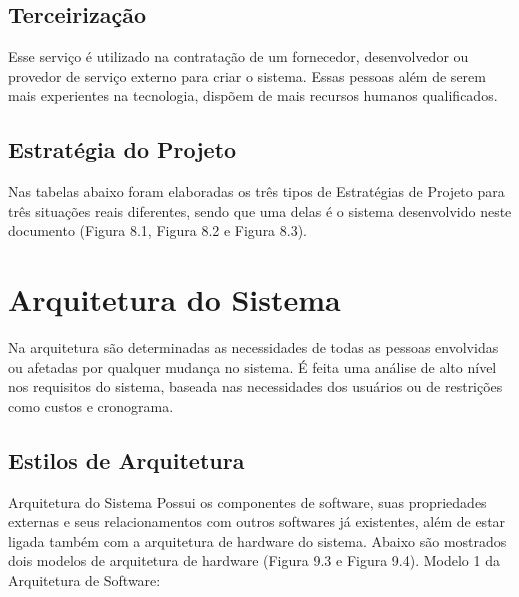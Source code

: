 \subsection{Terceirização}
 Esse serviço é utilizado na contratação de um fornecedor, desenvolvedor ou provedor de serviço externo para criar o sistema. Essas pessoas além de serem mais experientes na tecnologia, dispõem de mais recursos humanos qualificados.

\subsection{Estratégia do Projeto}
 Nas tabelas abaixo foram elaboradas os três tipos de Estratégias de Projeto para três situações reais diferentes, sendo que uma delas é o sistema desenvolvido neste documento (Figura 8.1, Figura 8.2 e Figura 8.3).
 
\section{Arquitetura do Sistema}
Na arquitetura são determinadas as necessidades de todas as pessoas envolvidas ou afetadas por qualquer mudança no sistema. É feita uma análise de alto nível nos requisitos do sistema, baseada nas necessidades dos usuários ou de restrições como custos e cronograma.

\subsection{Estilos de Arquitetura}
Arquitetura do Sistema
Possui os componentes de software, suas propriedades externas e seus relacionamentos com outros softwares já existentes, além de estar ligada também com a arquitetura de hardware do sistema. Abaixo são mostrados dois modelos de arquitetura de hardware (Figura 9.3 e Figura 9.4).
Modelo 1 da Arquitetura de Software: